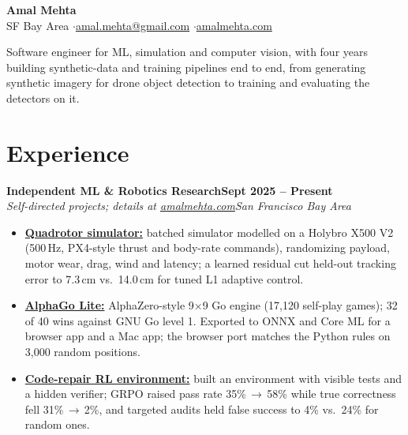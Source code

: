 \documentclass[10pt]{article}
\newcommand{\role}[4]{\textbf{#1}\hfill\textbf{#2}\\\textit{#3}\hfill\textit{#4}}
\begin{document}
\fontsize{9.8}{11.0}\selectfont

\begin{center}
{\LARGE\bfseries Amal Mehta}\\[3pt]
SF Bay Area \quad$\cdot$\quad \href{mailto:amal.mehta@gmail.com}{amal.mehta@gmail.com} \quad$\cdot$\quad \href{https://amalmehta.com/}{amalmehta.com}
\end{center}

Software engineer for ML, simulation and computer vision, with four years building synthetic-data and training pipelines end to end, from generating synthetic imagery for drone object detection to training and evaluating the detectors on it.

\section*{Experience}

\role{Independent ML \& Robotics Research}{Sept 2025 -- Present}{Self-directed projects; details at \href{https://amalmehta.com/}{amalmehta.com}}{San Francisco Bay Area}
\begin{itemize}
\item \href{https://amalmehta.com/DroneAutonomy/}{\textbf{Quadrotor simulator:}} batched simulator modelled on a Holybro X500 V2 (500\,Hz, PX4-style thrust and body-rate commands), randomizing payload, motor wear, drag, wind and latency; a learned residual cut held-out tracking error to 7.3\,cm vs.\ 14.0\,cm for tuned L1 adaptive control.
\item \href{https://amalmehta.com/AlphaGoLite/}{\textbf{AlphaGo Lite:}} AlphaZero-style 9$\times$9 Go engine (17,120 self-play games); 32 of 40 wins against GNU Go level 1. Exported to ONNX and Core ML for a browser app and a Mac app; the browser port matches the Python rules on 3,000 random positions.
\item \href{https://amalmehta.com/long_term_horizon_planning/}{\textbf{Code-repair RL environment:}} built an environment with visible tests and a hidden verifier; GRPO raised pass rate 35\%\,$\to$\,58\% while true correctness fell 31\%\,$\to$\,2\%, and targeted audits held false success to 4\% vs.\ 24\% for random ones.
\end{itemize}
\end{document}
